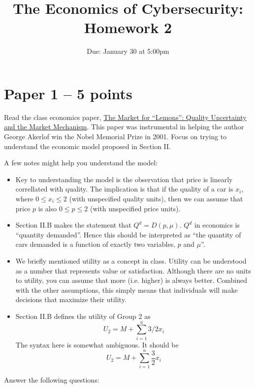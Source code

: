 \documentclass[11pt]{article}
\title{The Economics of Cybersecurity: Homework 2}
\date{Due: January 30 at 5:00pm}
\author{}
\begin{document}
\maketitle

\section{Paper 1 -- 5 points}

Read the class economics paper, \href{https://www.jstor.org/stable/1879431}{The Market for ``Lemons'': Quality Uncertainty and the Market Mechanism}. 
This paper was instrumental in helping the author George Akerlof win the Nobel Memorial Prize in 2001. 
Focus on trying to understand the economic model proposed in Section II.

A few notes might help you understand the model:
\begin{itemize}
    \item Key to understanding the model is the observation that price is linearly correllated with quality. The implication is that if the quality of a car is $x_i$, where $0\leq x_i \leq 2$ (with unspecified quality units), then we can assume that price $p$ is also $0 \leq p \leq 2$ (with unspecified price units).
    \item Section II.B makes the statement that $Q^d = D(p, \mu)$. $Q^d$ in economics is ``quantity demanded''. Hence this should be interpreted as ``the quantity of cars demanded is a function of exactly two variables, $p$ and $\mu$''.
    \item We briefly mentioned utility as a concept in class. Utility can be understood as a number that represents value or satisfaction. Although there are no units to utility, you can assume that more (i.e. higher) is always better. Combined with the other assumptions, this simply means that individuals will make decisions that maximize their utility.
    \item Section II.B defines the utility of Group 2 as $$U_2 = M + \sum_{i=1}^{n}{3/2x_i}$$ The syntax here is somewhat ambiguous. It should be $$U_2 = M + \sum_{i=1}^{n}{\frac{3}{2}x_i}$$
\end{itemize}
\vspace{1in}
Answer the following questions:
\end{document}
